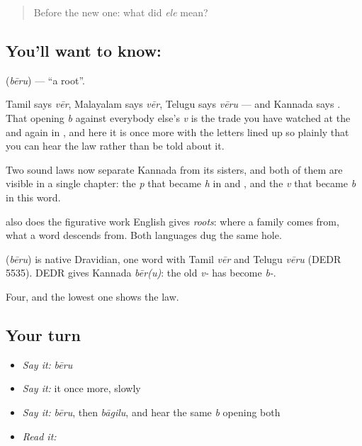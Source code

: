 \label{lesson:KA-C54-root}



\begin{quote}
Before the new one: what did \emph{ele} mean?
\end{quote}

\subsection*{You'll want to know: }
\textbf{} (\emph{bēru}) — \textquotedblleft{}a root\textquotedblright{}.

Tamil says \emph{vēr}, Malayalam says \emph{vēr}, Telugu says \emph{vēru} — and Kannada says . That opening \emph{b} against everybody else's \emph{v} is the trade you have watched at the  and again in , and here it is once more with the letters lined up so plainly that you can hear the law rather than be told about it.

Two sound laws now separate Kannada from its sisters, and both of them are visible in a single chapter: the \emph{p} that became \emph{h} in  and , and the \emph{v} that became \emph{b} in this word.

 also does the figurative work English gives \emph{roots}: where a family comes from, what a word descends from. Both languages dug the same hole.

\begin{cousinweb}
\textbf{} (\emph{bēru}) is native Dravidian, one word with Tamil \emph{vēr} and Telugu \emph{vēru} (DEDR 5535). DEDR gives Kannada \emph{bēr(u)}: the old \emph{v-} has become \emph{b-}.
\end{cousinweb}

\begin{grammarlens}[title={What you've built}]
Four, and the lowest one shows the law.
\end{grammarlens}

\subsection*{Your turn}
\begin{itemize}
\raggedright
  \item \emph{Say it:} \emph{bēru}
  \item \emph{Say it:} it once more, slowly
  \item \emph{Say it:} \emph{bēru}, then \emph{bāgilu}, and hear the same \emph{b} opening both
  \item \emph{Read it:} \textbf{}
\end{itemize}

